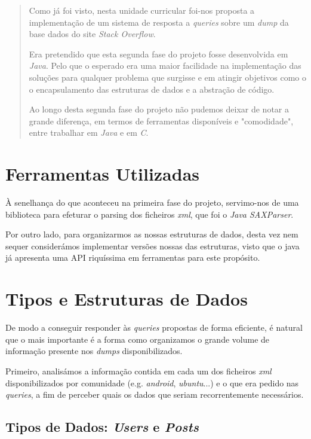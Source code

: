 \documentclass[10pt]{article}
\begin{document}
\begin{abstract}
		Como já foi visto, nesta unidade curricular foi-nos proposta 
	a implementação de um sistema de resposta a \textit{queries} 
	sobre um \textit{dump} da  base dados do site \emph{Stack 
	Overflow}.
		
		Era pretendido que esta segunda fase do projeto fosse
	desenvolvida em \emph{Java}. Pelo que o esperado era uma maior
	facilidade na implementação das soluções para qualquer problema 
	que surgisse e em atingir objetivos como o o encapsulamento das
	estruturas de dados e a abstração de código.
	
		Ao longo desta segunda fase do projeto não pudemos deixar 
	de notar a grande diferença, em termos de ferramentas disponíveis 
	e "comodidade", entre trabalhar em \emph{Java} e em \emph{C}.
\end{abstract}

\pagebreak

\section{Ferramentas Utilizadas} 

		À senelhança do que aconteceu na primeira fase do projeto,
	servimo-nos de uma biblioteca para efeturar o parsing dos 
	ficheiros \textit{xml}, que foi o \emph{Java SAXParser}.
	
		Por outro lado, para organizarmos as nossas estruturas de 
	dados, desta vez nem sequer considerámos implementar versões 
	nossas das estruturas, visto que o java já apresenta uma 
	API riquíssima em ferramentas para este propósito.
	
	
\section{Tipos e Estruturas de Dados}		

		De modo a conseguir responder às \textit{queries} propostas de forma eficiente, é natural
	que o mais importante é a forma como organizamos o grande volume de informação 
	presente nos \textit{dumps} disponibilizados.
		
		Primeiro, analisámos a informação contida em cada um dos ficheiros \textit{xml}
	disponibilizados por comunidade (e.g. \textit{android}, \textit{ubuntu}...) e o 
	que era pedido nas \textit{queries}, a fim de perceber quais os dados que seriam recorrentemente
	necessários.

	
\subsection{Tipos de Dados: \textit{Users} e \textit{Posts}}
	
\end{document}
